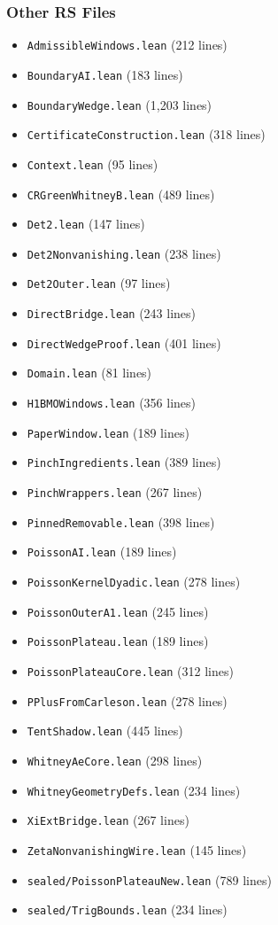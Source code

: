 \subsubsection{Other RS Files}
\begin{itemize}
    \item \texttt{AdmissibleWindows.lean} (212 lines)
    \item \texttt{BoundaryAI.lean} (183 lines)
    \item \texttt{BoundaryWedge.lean} (1,203 lines)
    \item \texttt{CertificateConstruction.lean} (318 lines)
    \item \texttt{Context.lean} (95 lines)
    \item \texttt{CRGreenWhitneyB.lean} (489 lines)
    \item \texttt{Det2.lean} (147 lines)
    \item \texttt{Det2Nonvanishing.lean} (238 lines)
    \item \texttt{Det2Outer.lean} (97 lines)
    \item \texttt{DirectBridge.lean} (243 lines)
    \item \texttt{DirectWedgeProof.lean} (401 lines)
    \item \texttt{Domain.lean} (81 lines)
    \item \texttt{H1BMOWindows.lean} (356 lines)
    \item \texttt{PaperWindow.lean} (189 lines)
    \item \texttt{PinchIngredients.lean} (389 lines)
    \item \texttt{PinchWrappers.lean} (267 lines)
    \item \texttt{PinnedRemovable.lean} (398 lines)
    \item \texttt{PoissonAI.lean} (189 lines)
    \item \texttt{PoissonKernelDyadic.lean} (278 lines)
    \item \texttt{PoissonOuterA1.lean} (245 lines)
    \item \texttt{PoissonPlateau.lean} (189 lines)
    \item \texttt{PoissonPlateauCore.lean} (312 lines)
    \item \texttt{PPlusFromCarleson.lean} (278 lines)
    \item \texttt{TentShadow.lean} (445 lines)
    \item \texttt{WhitneyAeCore.lean} (298 lines)
    \item \texttt{WhitneyGeometryDefs.lean} (234 lines)
    \item \texttt{XiExtBridge.lean} (267 lines)
    \item \texttt{ZetaNonvanishingWire.lean} (145 lines)
    \item \texttt{sealed/PoissonPlateauNew.lean} (789 lines)
    \item \texttt{sealed/TrigBounds.lean} (234 lines)
\end{itemize}

